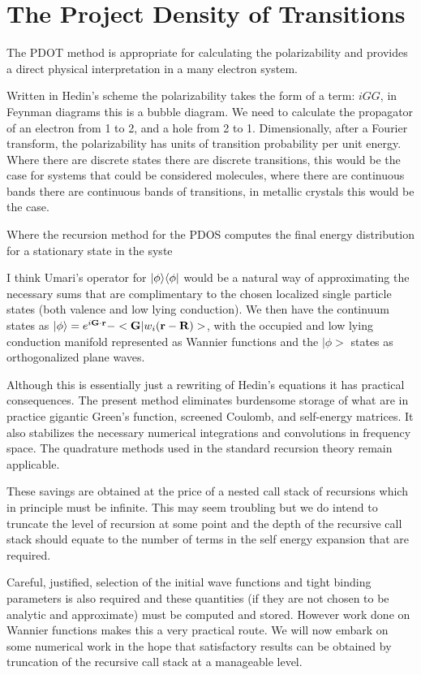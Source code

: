 \section{The Project Density of Transitions}
The PDOT\cite{annett93, haydock00, haydock16} method is 
appropriate for calculating the polarizability and provides a direct physical
interpretation in a many electron system. 

Written in Hedin's scheme the polarizability 
takes the form of a term: $iGG$, in Feynman diagrams this is a bubble diagram. We need to calculate the propagator
of an electron from 1 to 2, and a hole from 2 to 1. Dimensionally, after a Fourier transform,
the polarizability has units of transition probability per unit energy. Where there are discrete
states there are discrete transitions, this would be the case for systems
that could be considered molecules, where there are continuous bands there are continuous
bands of transitions, in metallic crystals this would be the case.

Where the recursion method for the PDOS computes the final energy distribution
for a stationary state in the syste


I think Umari's operator for $|\phi\rangle\langle\phi|$ would be a natural way of
approximating the necessary sums that are complimentary to the chosen
localized single particle states (both valence and low lying conduction).
We then have the continuum states as $|\phi\rangle=e^{i{\bf G}\cdot{\bf r}}-<{\bf G}|w_{i}({\bf r}-{\bf R})>$,
with the occupied and low lying conduction manifold represented as Wannier 
functions and the $|\phi>$ states as orthogonalized plane waves.

	Although this is essentially just a rewriting of Hedin's equations
it has practical consequences. The present method eliminates
burdensome storage of what are in practice gigantic Green's function, 
screened Coulomb, and self-energy matrices. It also 
stabilizes the necessary numerical integrations and convolutions in frequency space. 
The quadrature methods used in the standard recursion theory remain applicable.

These savings are obtained at the price of a nested call stack of recursions which 
in principle must be infinite. This may seem troubling but we do intend to truncate
the level of recursion at some point and the depth of the recursive call stack should
equate to the number of terms in the self energy expansion that are required.

	Careful, justified, selection of the initial wave functions and tight binding parameters
is also required and these quantities (if they are not chosen to be analytic and approximate)
must be computed and stored. However work done on Wannier functions makes this a very
practical route. We will now embark on some numerical work in the hope that satisfactory 
results can be obtained by truncation of the recursive call stack at a manageable level. 

